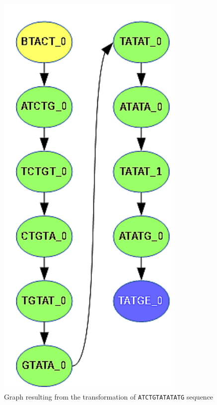 \begin{figure}
	\centering
	\includegraphics{img/ref-my.pdf}
	\caption{Graph resulting from the transformation of \texttt{ATCTGTATATATG} sequence}
	\label{fig:ref-my}
\end{figure}

